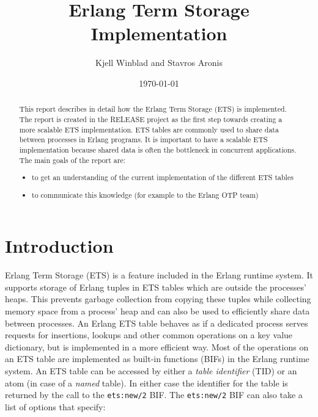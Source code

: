 \documentclass[aps,pre,preprint,nofootinbib]{revtex4}
\begin{document}
\title{Erlang Term Storage Implementation}
\author{Kjell Winblad and Stavros Aronis}
\date{\today}


\begin{abstract}

  This report describes in detail how the Erlang Term Storage (ETS) is implemented.
  The report is created in the RELEASE project as the first step towards creating a more scalable ETS implementation.
  ETS tables are commonly used to share data between processes in Erlang programs.
  It is important to have a scalable ETS implementation because shared data is often the bottleneck in concurrent applications.
  The main goals of the report are:
  \begin{itemize}
   \item to get an understanding of the current implementation of the different ETS tables
   \item to communicate this knowledge (for example to the Erlang OTP team)
  \end{itemize} 

\end{abstract}

\maketitle

\section{Introduction}

Erlang Term Storage (ETS) is a feature included in the Erlang runtime system.
It supports storage of Erlang tuples in ETS tables which are outside the processes' heaps.
This prevents garbage collection from copying these tuples while collecting memory space from a process' heap and can also be used to efficiently share data between processes. %
An Erlang ETS table behaves as if a dedicated process serves requests for insertions, lookups and other common operations on a key value dictionary, but is implemented in a more efficient way.
Most of the operations on an ETS table are implemented as built-in functions (BIFs) in the Erlang runtime system. 
An ETS table can be accessed by either a \emph{table identifier} (TID) or an atom (in case of a \emph{named} table).
In either case the identifier for the table is returned by the call to the \verb|ets:new/2| BIF.
The \verb|ets:new/2| BIF can also take a list of options that specify: 
\end{document}
